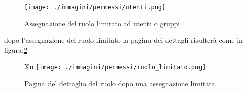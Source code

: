 \begin{figure}[H]
 \centering
 \texttt{[image: ./immagini/permessi/utenti.png]}
 \caption{Assegnazione del ruolo limitato ad utenti o gruppi}
 \label{fig:perm_utente_ass}
\end{figure}


dopo l'assegnazione del ruolo limitato la pagina dei dettagli risulterà come in figura.\ref{fig:perm_lim}
\begin{figure}[H]Xu
 \centering
 \texttt{[image: ./immagini/permessi/ruolo\_limitato.png]}
 \caption{Pagina del  dettaglio del ruolo dopo una assegnazione limitata}
 \label{fig:perm_lim}
\end{figure}





